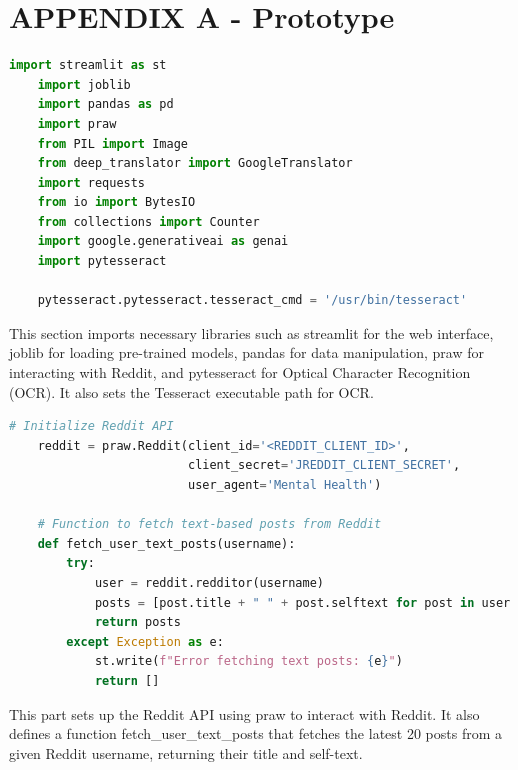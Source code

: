 

\section*{APPENDIX A - Prototype \label{sec:proto}}

\begin{tcolorbox}[colback=gray!5!white, colframe=gray!80!black, boxrule=0.5pt, title=Import Libraries and Setup]
    \begin{lstlisting}[language=Python]
    import streamlit as st
    import joblib
    import pandas as pd
    import praw
    from PIL import Image
    from deep_translator import GoogleTranslator
    import requests
    from io import BytesIO
    from collections import Counter
    import google.generativeai as genai
    import pytesseract
    
    pytesseract.pytesseract.tesseract_cmd = '/usr/bin/tesseract'
    \end{lstlisting}
    \end{tcolorbox}
\noindent
This section imports necessary libraries such as streamlit for the web interface, joblib for loading pre-trained models, pandas for data manipulation, praw for interacting with Reddit, and pytesseract for Optical Character Recognition (OCR). It also sets the Tesseract executable path for OCR.    

\begin{tcolorbox}[colback=gray!5!white, colframe=gray!80!black, boxrule=0.5pt, title=Reddit API Setup and Functions]
    \begin{lstlisting}[language=Python]
    # Initialize Reddit API
    reddit = praw.Reddit(client_id='<REDDIT_CLIENT_ID>',
                         client_secret='JREDDIT_CLIENT_SECRET',
                         user_agent='Mental Health')
    
    # Function to fetch text-based posts from Reddit
    def fetch_user_text_posts(username):
        try:
            user = reddit.redditor(username)
            posts = [post.title + " " + post.selftext for post in user.submissions.new(limit=20)]
            return posts
        except Exception as e:
            st.write(f"Error fetching text posts: {e}")
            return []
    \end{lstlisting}
    \end{tcolorbox}
\noindent
This part sets up the Reddit API using praw to interact with Reddit. It also defines a function fetch\_user\_text\_posts that fetches the latest 20 posts from a given Reddit username, returning their title and self-text.

